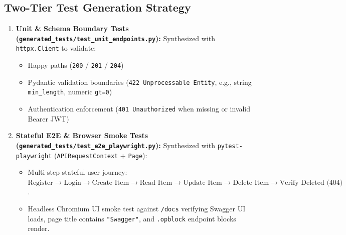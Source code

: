 \documentclass[11pt,a4paper]{article}
\begin{document}
\subsection{Two-Tier Test Generation Strategy}
\begin{enumerate}[leftmargin=1.5em]
    \item \textbf{Unit \& Schema Boundary Tests (\texttt{generated\_tests/test\_unit\_endpoints.py}):} Synthesized with \texttt{httpx.Client} to validate:
    \begin{itemize}[leftmargin=1.5em]
        \item Happy paths (\texttt{200} / \texttt{201} / \texttt{204})
        \item Pydantic validation boundaries (\texttt{422 Unprocessable Entity}, e.g., string \texttt{min\_length}, numeric \texttt{gt=0})
        \item Authentication enforcement (\texttt{401 Unauthorized} when missing or invalid Bearer JWT)
    \end{itemize}
    \item \textbf{Stateful E2E \& Browser Smoke Tests (\texttt{generated\_tests/test\_e2e\_playwright.py}):} Synthesized with \texttt{pytest-playwright} (\texttt{APIRequestContext} + \texttt{Page}):
    \begin{itemize}[leftmargin=1.5em]
        \item Multi-step stateful user journey: $\text{Register} \rightarrow \text{Login} \rightarrow \text{Create Item} \rightarrow \text{Read Item} \rightarrow \text{Update Item} \rightarrow \text{Delete Item} \rightarrow \text{Verify Deleted (404)}$.
        \item Headless Chromium UI smoke test against \texttt{/docs} verifying Swagger UI loads, page title contains \texttt{"Swagger"}, and \texttt{.opblock} endpoint blocks render.
    \end{itemize}
\end{enumerate}
\end{document}
